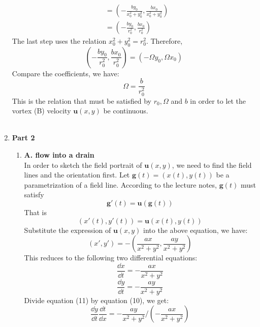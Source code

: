 \documentclass{article}
\begin{document}
\begin{enumerate}
\begin{align*}
  &= \left(-\frac{by_0}{x_0^2+y_0^2}, \frac{bx_0}{x_0^2+y_0^2}\right)\\
  &= \left( -\frac{by_0}{r_0^2}, \frac{bx_0}{r_0^2}\right)
\end{align*}
The last step uses the relation \(x_0^2+y_0^2 = r_0^2\).
Therefore,
\begin{equation}
  \left( -\frac{by_0}{r_0^2}, \frac{bx_0}{r_0^2}\right)  = (-\Omega y_0, \Omega x_0)
\end{equation}
Compare the coefficients, we have:
\begin{equation}
  \Omega = \frac{b}{r_0^2}
\end{equation}
This is the relation that must be satisfied by \(r_0, \Omega\) and \(b\) in order to let the vortex (B) velocity \(\mathbf{u}(x,y)\) be continuous.
\pagebreak \\ \\
\item \textbf{Part 2}
\begin{enumerate}
  \item \textbf{A. flow into a drain}\\
  In order to sketch the field portrait of \(\mathbf{u}(x,y)\), we need to find the field lines and the orientation first.
  Let \(\mathbf{g}(t) =(x(t), y(t))\) be a parametrization of a field line.
  According to the lecture notes, \(\mathbf{g}(t)\) must satisfy
  \begin{equation}
    \mathbf{g}'(t) = \mathbf{u}(\mathbf{g}(t))
  \end{equation}
  That is
  \begin{equation}
    (x'(t), y'(t)) = \mathbf{u}(x(t), y(t))
  \end{equation}
  Substitute the expression of \(\mathbf{u}(x,y)\) into the above equation, we have:
  \begin{equation}
    (x', y') = -\left(\frac{ax}{x^2+y^2}, \frac{ay}{x^2+y^2}\right)
  \end{equation}
  This reduces to the following two differential equations:
  \begin{equation}
    \frac{\dd x}{\dd t} = - \frac{ax}{x^2+y^2}
  \end{equation}
  \begin{equation}
    \frac{\dd y}{\dd t} = - \frac{ay}{x^2+y^2}
  \end{equation}
  Divide equation (11) by equation (10), we get:
  \begin{equation}
    \frac{\dd y}{\dd t} \frac{\dd t}{\dd x} = - \frac{ay}{x^2+y^2}/\left(- \frac{ax}{x^2+y^2}\right)

\end{equation}
\end{enumerate}
\end{enumerate}
\end{document}
